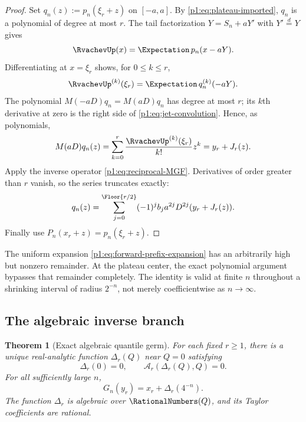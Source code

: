 \documentclass[11pt,oneside]{article}
\numberwithin{equation}{section}
\newtheorem{theorem}{Theorem}[section]
\theoremstyle{definition}
\theoremstyle{remark}
\newcommand{\Fn}{P_n}
\begin{document}
\begin{proof}
Set $q_n(z):=p_n(\xi_r+z)$ on $[-a,a]$.  By
\eqref{p1:eq:plateau-imported}, $q_n$ is a polynomial of degree at most $r$.
The tail factorization $Y=S_n+aY'$ with $Y'\stackrel d=Y$ gives
\begin{equation}
 \RvachevUp(x)=\Expectation\,p_n(x-aY).
 \label{p1:eq:convolution-expectation}
\end{equation}
Differentiating at $x=\xi_r$ shows, for $0\le k\le r$,
\begin{equation}
 \RvachevUp^{(k)}(\xi_r)=\Expectation\,q_n^{(k)}(-aY).
 \label{p1:eq:jet-convolution}
\end{equation}
The polynomial $M(-aD)q_n=M(aD)q_n$ has degree at most $r$; its $k$th
derivative at zero is the right side of \eqref{p1:eq:jet-convolution}.  Hence, as
polynomials,
\begin{equation}
 M(aD)q_n(z)=
 \sum_{k=0}^{r}\frac{\RvachevUp^{(k)}(\xi_r)}{k!}z^k
 =y_r+J_r(z).
 \label{p1:eq:polynomial-smoothing}
\end{equation}
Apply the inverse operator \eqref{p1:eq:reciprocal-MGF}.  Derivatives of order greater
than $r$ vanish, so the series truncates exactly:
\[
 q_n(z)=\sum_{j=0}^{\Floor{r/2}}
 (-1)^jb_ja^{2j}D^{2j}(y_r+J_r(z)).
\]
Finally use $\Fn(x_r+z)=p_n(\xi_r+z)$.
\end{proof}

\begin{remark}
The uniform expansion \eqref{p1:eq:forward-prefix-expansion} has an arbitrarily high but
nonzero remainder.  At the plateau center, the exact polynomial argument bypasses that
remainder completely.  The identity is valid at finite $n$ throughout a shrinking interval
of radius $2^{-n}$, not merely coefficientwise as $n\to\infty$.
\end{remark}

\subsection{The algebraic inverse branch}

\begin{theorem}[Exact algebraic quantile germ]
\label{p1:thm:algebraic-germ}
For each fixed $r\ge1$, there is a unique real-analytic function $\Delta_r(Q)$ near
$Q=0$ satisfying
\begin{equation}
 \Delta_r(0)=0,
 \qquad
 \mathcal A_r(\Delta_r(Q),Q)=0.
 \label{p1:eq:Delta-implicit}
\end{equation}
For all sufficiently large $n$,
\begin{equation}
 \boxed{
 G_n(y_r)=x_r+\Delta_r(4^{-n}).}
 \label{p1:eq:exact-quantile-germ}
\end{equation}
The function $\Delta_r$ is algebraic over $\RationalNumbers(Q)$, and its Taylor coefficients are
rational.
\end{theorem}
\end{document}
